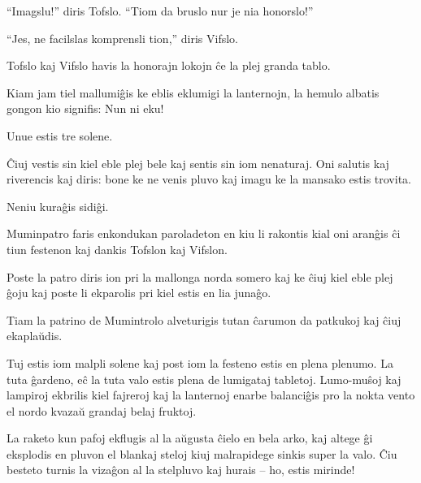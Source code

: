 ``Imagslu!'' diris Tofslo. ``Tiom da bruslo nur je nia honorslo!''

``Jes, ne facilslas komprensli tion,'' diris Vifslo.

Tofslo kaj Vifslo havis la honorajn lokojn ĉe la plej granda tablo.

Kiam jam tiel mallumiĝis ke eblis eklumigi la lanternojn, la hemulo albatis gongon kio signifis: Nun ni eku!

Unue estis tre solene.

Ĉiuj vestis sin kiel eble plej bele kaj sentis sin iom nenaturaj. Oni salutis kaj riverencis kaj diris: bone ke ne venis pluvo kaj imagu ke la mansako estis trovita.

Neniu kuraĝis sidiĝi.

Muminpatro faris enkondukan paroladeton en kiu li rakontis kial oni aranĝis ĉi tiun festenon kaj dankis Tofslon kaj Vifslon.

Poste la patro diris ion pri la mallonga norda somero kaj ke ĉiuj kiel eble plej ĝoju kaj poste li ekparolis pri kiel estis en lia junaĝo.

Tiam la patrino de Mumintrolo alveturigis tutan ĉarumon da patkukoj kaj ĉiuj ekaplaŭdis.

Tuj estis iom malpli solene kaj post iom la festeno estis en plena plenumo. La tuta ĝardeno, eĉ la tuta valo estis plena de lumigataj tabletoj. Lumo-muŝoj kaj lampiroj ekbrilis kiel fajreroj kaj la lanternoj enarbe balanciĝis pro la nokta vento el nordo kvazaŭ grandaj belaj fruktoj.

La raketo kun pafoj ekflugis al la aŭgusta ĉielo en bela arko, kaj altege ĝi eksplodis en pluvon el blankaj steloj kiuj malrapidege sinkis super la valo. Ĉiu besteto turnis la vizaĝon al la stelpluvo kaj hurais -- ho, estis mirinde!

